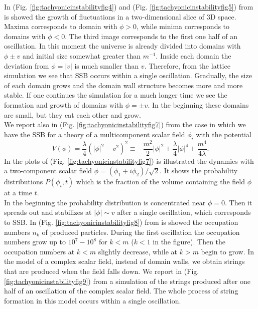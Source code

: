 \documentclass[11pt,a4paper,twoside]{book}
\begin{document}
In (Fig. \ref{fig:tachyonicinstabilityfig4}) and (Fig. \ref{fig:tachyonicinstabilityfig5}) from \cite{Chap5:TachyonicInstability} is showed the growth of fluctuations in a two-dimensional slice of 3D space. Maxima corresponds to domain with $\phi > 0$, while minima corresponds to domains with $\phi < 0$. The third image corresponds to the first one half of an oscillation. In this moment the universe is already divided into domains with $ \phi \pm v $ and initial  size somewhat greater than $ m^{-1} $. Inside  each domain the deviation from $ \phi = |v| $ is much smaller than $ v $. Therefore, from the lattice simulation we see that SSB occurs within a single oscillation. Gradually, the size of each domain grows and the domain wall structure becomes more and more stable. If one continues the simulation for a much longer time we see the formation and growth of domains with $ \phi=\pm v $. In the beginning these domains are small, but they eat each other and grow.\\
We report also in (Fig. \ref{fig:tachyonicinstabilityfig7}) from \cite{Chap5:TachyonicInstability} the case in which we have the SSB for a theory of a multicomponent scalar field $ \phi_{i} $ with the potential
\begin{equation}
	\label{Chap5:TachyonicModelComplex}
	V(\phi)=\frac{\lambda}{4}(|\phi|^{2}-v^{2})^{2} \equiv -\frac{m^{2}}{2}|\phi|^{2} + \frac{\lambda}{4}|\phi|^{4} + \frac{m^{4}}{4\lambda}.
\end{equation} 
In the plots of (Fig. \ref{fig:tachyonicinstabilityfig7}) is illustrated the dynamics with a two-component scalar field $\phi = (\phi_{1} + i\phi_{2})/\sqrt{2}$. It shows the probability distributions $ P(\phi_{i},t) $ which is the fraction of the volume containing the field $\phi$ at a time $ t $.\\
In the beginning  the probability distribution is concentrated near $\phi=0$. Then it spreads out and stabilizes at $ |\phi|\sim v $ after a single oscillation, which corresponds to SSB. In (Fig. \ref{fig:tachyonicinstabilityfig8}) from \cite{Chap5:TachyonicInstability} is showed the occupation numbers $ n_{k} $ of produced particles. During the first oscillation the occupation numbers grow up to $ 10^{7}-10^{8} $ for $ k < m $ ($ k < 1 $ in the figure). Then the occupation numbers at $ k < m $ slightly decrease, while at $ k > m $ begin to grow. In the model of a complex scalar field, instead of domain walls, we obtain strings that are produced when the field falls down. We report in (Fig. \ref{fig:tachyonicinstabilityfig9}) from \cite{Chap5:TachyonicInstability} a simulation of the strings produced after one half of an oscillation of the complex scalar field. The whole process of string formation in this model occurs within a single oscillation.\\
\end{document}
